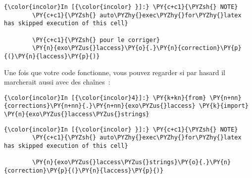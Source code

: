     \begin{Verbatim}[commandchars=\\\{\},frame=single,framerule=0.3mm,rulecolor=\color{cellframecolor}]
{\color{incolor}In [{\color{incolor} }]:} \PY{c+c1}{\PYZsh{} NOTE}
        \PY{c+c1}{\PYZsh{} auto\PYZhy{}exec\PYZhy{}for\PYZhy{}latex has skipped execution of this cell}
        
        \PY{c+c1}{\PYZsh{} pour le corriger}
        \PY{n}{exo\PYZus{}laccess}\PY{o}{.}\PY{n}{correction}\PY{p}{(}\PY{n}{laccess}\PY{p}{)}
\end{Verbatim}


    Une fois que votre code fonctionne, vous pouvez regarder si par hasard
il marcherait aussi avec des chaînes~:

    \begin{Verbatim}[commandchars=\\\{\},frame=single,framerule=0.3mm,rulecolor=\color{cellframecolor}]
{\color{incolor}In [{\color{incolor}4}]:} \PY{k+kn}{from} \PY{n+nn}{corrections}\PY{n+nn}{.}\PY{n+nn}{exo\PYZus{}laccess} \PY{k}{import} \PY{n}{exo\PYZus{}laccess\PYZus{}strings}
\end{Verbatim}


    \begin{Verbatim}[commandchars=\\\{\},frame=single,framerule=0.3mm,rulecolor=\color{cellframecolor}]
{\color{incolor}In [{\color{incolor} }]:} \PY{c+c1}{\PYZsh{} NOTE}
        \PY{c+c1}{\PYZsh{} auto\PYZhy{}exec\PYZhy{}for\PYZhy{}latex has skipped execution of this cell}
        
        \PY{n}{exo\PYZus{}laccess\PYZus{}strings}\PY{o}{.}\PY{n}{correction}\PY{p}{(}\PY{n}{laccess}\PY{p}{)}
\end{Verbatim}



    
    
    
